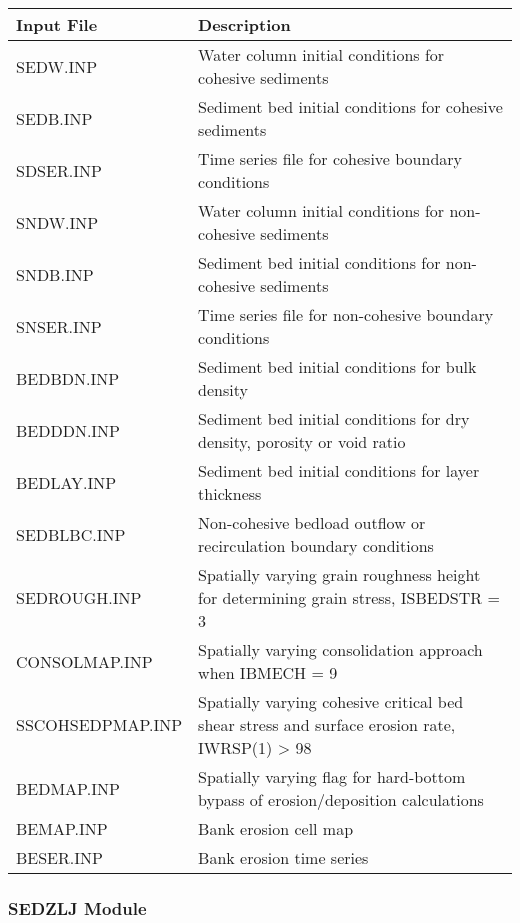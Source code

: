 \documentclass[letterpaper,10pt,english]{sphinxmanual}
\begin{document}
\begin{savenotes}\sphinxattablestart
\centering
\begin{tabulary}{\linewidth}[t]{|T|T|}
\hline
\sphinxstyletheadfamily 
Input File
&\sphinxstyletheadfamily 
Description
\\
\hline
SEDW.INP
&
Water column initial conditions for cohesive sediments
\\
\hline
SEDB.INP
&
Sediment bed initial conditions for cohesive sediments
\\
\hline
SDSER.INP
&
Time series file for cohesive boundary conditions
\\
\hline
SNDW.INP
&
Water column initial conditions for non-cohesive sediments
\\
\hline
SNDB.INP
&
Sediment bed initial conditions for non-cohesive sediments
\\
\hline
SNSER.INP
&
Time series file for non-cohesive boundary conditions
\\
\hline
BEDBDN.INP
&
Sediment bed initial conditions for bulk density
\\
\hline
BEDDDN.INP
&
Sediment bed initial conditions for dry density, porosity or void ratio
\\
\hline
BEDLAY.INP
&
Sediment bed initial conditions for layer thickness
\\
\hline
SEDBLBC.INP
&
Non-cohesive bedload outflow or recirculation boundary conditions
\\
\hline
SEDROUGH.INP
&
Spatially varying grain roughness height for determining grain stress, ISBEDSTR = 3
\\
\hline
CONSOLMAP.INP
&
Spatially varying consolidation approach when IBMECH = 9
\\
\hline
SSCOHSEDPMAP.INP
&
Spatially varying cohesive critical bed shear stress and surface erosion rate, IWRSP(1) \textgreater{} 98
\\
\hline
BEDMAP.INP
&
Spatially varying flag for hard-bottom bypass of erosion/deposition calculations
\\
\hline
BEMAP.INP
&
Bank erosion cell map
\\
\hline
BESER.INP
&
Bank erosion time series
\\
\hline
\end{tabulary}
\par
\sphinxattableend\end{savenotes}


\subsubsection{SEDZLJ Module}
\label{\detokenize{inputfiles/sediment/index:sedzlj-module}}
\end{document}
